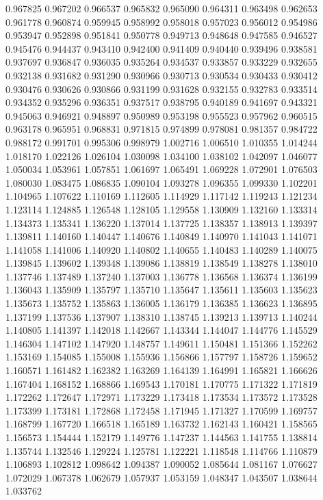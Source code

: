 0.967825
0.967202
0.966537
0.965832
0.965090
0.964311
0.963498
0.962653
0.961778
0.960874
0.959945
0.958992
0.958018
0.957023
0.956012
0.954986
0.953947
0.952898
0.951841
0.950778
0.949713
0.948648
0.947585
0.946527
0.945476
0.944437
0.943410
0.942400
0.941409
0.940440
0.939496
0.938581
0.937697
0.936847
0.936035
0.935264
0.934537
0.933857
0.933229
0.932655
0.932138
0.931682
0.931290
0.930966
0.930713
0.930534
0.930433
0.930412
0.930476
0.930626
0.930866
0.931199
0.931628
0.932155
0.932783
0.933514
0.934352
0.935296
0.936351
0.937517
0.938795
0.940189
0.941697
0.943321
0.945063
0.946921
0.948897
0.950989
0.953198
0.955523
0.957962
0.960515
0.963178
0.965951
0.968831
0.971815
0.974899
0.978081
0.981357
0.984722
0.988172
0.991701
0.995306
0.998979
1.002716
1.006510
1.010355
1.014244
1.018170
1.022126
1.026104
1.030098
1.034100
1.038102
1.042097
1.046077
1.050034
1.053961
1.057851
1.061697
1.065491
1.069228
1.072901
1.076503
1.080030
1.083475
1.086835
1.090104
1.093278
1.096355
1.099330
1.102201
1.104965
1.107622
1.110169
1.112605
1.114929
1.117142
1.119243
1.121234
1.123114
1.124885
1.126548
1.128105
1.129558
1.130909
1.132160
1.133314
1.134373
1.135341
1.136220
1.137014
1.137725
1.138357
1.138913
1.139397
1.139811
1.140160
1.140447
1.140676
1.140849
1.140970
1.141043
1.141071
1.141058
1.141006
1.140920
1.140802
1.140655
1.140483
1.140289
1.140075
1.139845
1.139602
1.139348
1.139086
1.138819
1.138549
1.138278
1.138010
1.137746
1.137489
1.137240
1.137003
1.136778
1.136568
1.136374
1.136199
1.136043
1.135909
1.135797
1.135710
1.135647
1.135611
1.135603
1.135623
1.135673
1.135752
1.135863
1.136005
1.136179
1.136385
1.136623
1.136895
1.137199
1.137536
1.137907
1.138310
1.138745
1.139213
1.139713
1.140244
1.140805
1.141397
1.142018
1.142667
1.143344
1.144047
1.144776
1.145529
1.146304
1.147102
1.147920
1.148757
1.149611
1.150481
1.151366
1.152262
1.153169
1.154085
1.155008
1.155936
1.156866
1.157797
1.158726
1.159652
1.160571
1.161482
1.162382
1.163269
1.164139
1.164991
1.165821
1.166626
1.167404
1.168152
1.168866
1.169543
1.170181
1.170775
1.171322
1.171819
1.172262
1.172647
1.172971
1.173229
1.173418
1.173534
1.173572
1.173528
1.173399
1.173181
1.172868
1.172458
1.171945
1.171327
1.170599
1.169757
1.168799
1.167720
1.166518
1.165189
1.163732
1.162143
1.160421
1.158565
1.156573
1.154444
1.152179
1.149776
1.147237
1.144563
1.141755
1.138814
1.135744
1.132546
1.129224
1.125781
1.122221
1.118548
1.114766
1.110879
1.106893
1.102812
1.098642
1.094387
1.090052
1.085644
1.081167
1.076627
1.072029
1.067378
1.062679
1.057937
1.053159
1.048347
1.043507
1.038644
1.033762
